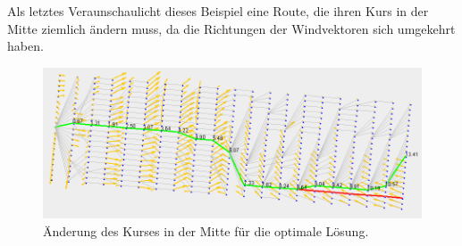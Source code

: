 Als letztes Veraunschaulicht dieses Beispiel eine Route, die ihren Kurs in der
Mitte ziemlich ändern muss, da die Richtungen der Windvektoren sich umgekehrt
haben. 

\begin{figure}[h!]
\centering
\includegraphics[width=0.8\linewidth]{img/gridNet_20}
\caption{Änderung des Kurses in der Mitte für die optimale Lösung.}
\label{gridnet3}
\end{figure}
